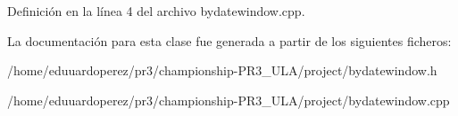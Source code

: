 Definición en la línea 4 del archivo bydatewindow.\+cpp.



La documentación para esta clase fue generada a partir de los siguientes ficheros\+:\begin{DoxyCompactItemize}
\item 
/home/eduuardoperez/pr3/championship-\/\+P\+R3\+\_\+\+U\+L\+A/project/bydatewindow.\+h\item 
/home/eduuardoperez/pr3/championship-\/\+P\+R3\+\_\+\+U\+L\+A/project/bydatewindow.\+cpp\end{DoxyCompactItemize}
